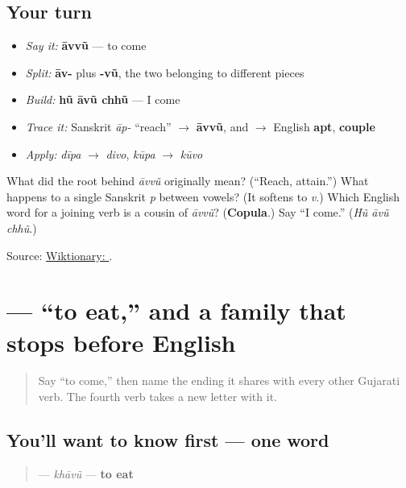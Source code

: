 \subsection*{Your turn}
\begin{itemize}
\raggedright
  \item \emph{Say it:} \textbf{āvvũ} — to come
  \item \emph{Split:} \textbf{āv-} plus \textbf{-vũ}, the two  belonging to different pieces
  \item \emph{Build:} \textbf{hũ āvũ chhũ} — I come
  \item \emph{Trace it:} Sanskrit \emph{āp-} \textquotedblleft{}reach\textquotedblright{} $\to$ \textbf{āvvũ}, and $\to$ English \textbf{apt}, \textbf{couple}
  \item \emph{Apply:} \emph{dīpa} $\to$ \emph{divo}, \emph{kūpa} $\to$ \emph{kūvo}
\end{itemize}

\begin{tcolorbox}[breakable,colback=teal!4,colframe=teal!35!black,title={Before you move on}]
What did the root behind \emph{āvvũ} originally mean? (\textquotedblleft{}Reach, attain.\textquotedblright{}) What happens to a single Sanskrit \emph{p} between vowels? (It softens to \emph{v}.) Which English word for a joining verb is a cousin of \emph{āvvũ}? (\textbf{Copula}.) Say \textquotedblleft{}I come.\textquotedblright{} (\emph{Hũ āvũ chhũ}.)

Source: \href{https://en.wiktionary.org/wiki/\%E0\%AA\%86\%E0\%AA\%B5\%E0\%AA\%B5\%E0\%AB\%81\%E0\%AA\%82}{Wiktionary: }.
\end{tcolorbox}
\section[\texorpdfstring{\gu{ખાવું} (khāvũ)}{ખાવું (khāvũ)}]{ — \textquotedblleft{}to eat,\textquotedblright{} and a family that stops before English}

\label{lesson:GU-C07-khaavun}



\begin{quote}
Say \textquotedblleft{}to come,\textquotedblright{} then name the ending it shares with every other Gujarati verb. The fourth verb takes a new letter with it.
\end{quote}

\subsection*{You'll want to know first — one word}
\begin{quote}
\textbf{} — \emph{khāvũ} — \textbf{to eat}
\end{quote}


